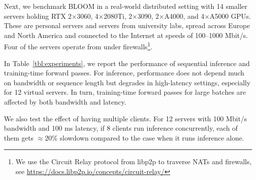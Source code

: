 Next, we benchmark BLOOM in a real-world distributed setting with 14 smaller servers holding RTX 2$\times$3060, 4$\times$2080Ti, 2$\times$3090, 2$\times$A4000, and 4$\times$A5000 GPUs. These are personal servers and servers from university labs, spread across Europe and North America and connected to the Internet at speeds of 100--1000 Mbit/s. Four of the servers operate from under firewalls\footnote{We use the Circuit Relay protocol from libp2p to traverse NATs and firewalls, see \url{https://docs.libp2p.io/concepts/circuit-relay/}}.

In Table~\ref{tbl:experiments}, we report the performance of sequential inference and training-time forward passes. For inference, performance does not depend much on bandwidth or sequence length but degrades in high-latency settings, especially for 12 virtual servers.
In turn, training-time forward passes for large batches are affected by both bandwidth and latency.

We also test the effect of having multiple clients. For 12 servers with 100 Mbit/s bandwidth and 100 ms latency, if 8 clients run inference concurrently, each of them gets $\approx20\%$ slowdown compared to the case when it runs inference alone.





